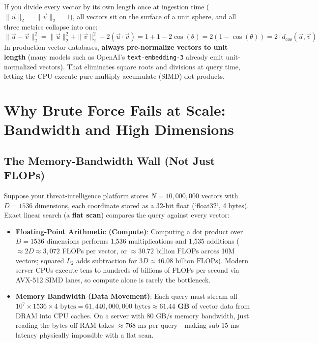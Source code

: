 \begin{intuitionbox}
If you divide every vector by its own length once at ingestion time ($\|\vec{u}\|_2 = \|\vec{v}\|_2 = 1$), all vectors sit on the surface of a unit sphere, and all three metrics collapse into one:
\begin{equation}
\|\vec{u} - \vec{v}\|_2^2 = \|\vec{u}\|_2^2 + \|\vec{v}\|_2^2 - 2(\vec{u} \cdot \vec{v}) = 1 + 1 - 2\cos(\theta) = 2(1 - \cos(\theta)) = 2 \cdot d_{\cos}(\vec{u}, \vec{v})
\end{equation}
In production vector databases, \textbf{always pre-normalize vectors to unit length} (many models such as OpenAI's \texttt{text-embedding-3} already emit unit-normalized vectors). That eliminates square roots and divisions at query time, letting the CPU execute pure multiply-accumulate (SIMD) dot products.
\end{intuitionbox}

\section{Why Brute Force Fails at Scale: Bandwidth and High Dimensions}

\subsection{The Memory-Bandwidth Wall (Not Just FLOPs)}
Suppose your threat-intelligence platform stores $N = 10{,}000{,}000$ vectors with $D = 1536$ dimensions, each coordinate stored as a 32-bit float (`float32`, 4 bytes). Exact linear search (a \textbf{flat scan}) compares the query against every vector:
\begin{itemize}[leftmargin=18pt]
  \item \textbf{Floating-Point Arithmetic (Compute)}: Computing a dot product over $D = 1536$ dimensions performs 1,536 multiplications and 1,535 additions ($\approx 2D \approx 3{,}072$ FLOPs per vector, or $\approx 30.72\text{ billion FLOPs}$ across 10M vectors; squared $L_2$ adds subtraction for $3D \approx 46.08\text{ billion FLOPs}$). Modern server CPUs execute tens to hundreds of billions of FLOPs per second via AVX-512 SIMD lanes, so compute alone is rarely the bottleneck.
  \item \textbf{Memory Bandwidth (Data Movement)}: Each query must stream all $10^7 \times 1536 \times 4\text{ bytes} = 61{,}440{,}000{,}000\text{ bytes} \approx \mathbf{61.44\text{ GB}}$ of vector data from DRAM into CPU caches. On a server with 80 GB/s memory bandwidth, just reading the bytes off RAM takes $\approx 768\text{ ms}$ per query---making sub-15 ms latency physically impossible with a flat scan.
\end{itemize}


